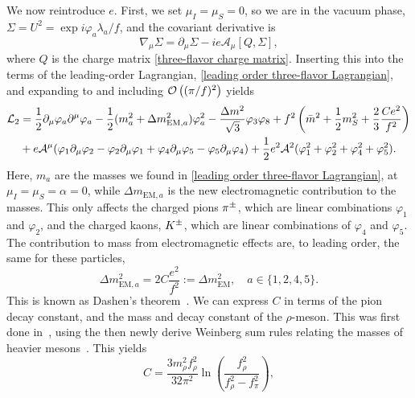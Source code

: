 We now reintroduce $e$.
First, we set $\mu_I = \mu_S = 0$, so we are in the vacuum phase, $\Sigma = U^2 = \exp{i \varphi_a \lambda_a/f}$, and the covariant derivative is
%
\begin{equation}
    \nabla_\mu \Sigma = \partial_\mu \Sigma - i e \mathcal A_\mu [Q, \Sigma],
\end{equation}
%
where $Q$ is the charge matrix \autoref{three-flavor charge matrix}.
Inserting this into the terms of the leading-order Lagrangian, \autoref{leading order three-flavor Lagrangian}, and expanding to and including $\mathcal O\left((\pi/f)^2\right)$ yields
%
\begin{align}
    \nonumber
    \mathcal{L}_2
    &= 
    \frac{1}{2} \partial_\mu \varphi_a \partial^\mu \varphi_a
    - \frac{1}{2}(m_{a}^2 + \Delta m_{\text{EM},a}^2)\varphi_a^2
    - \frac{\Delta m^2}{\sqrt 3} \varphi_3 \varphi_8
    + f^2 \left(\bar m^2 + \frac{1}{2} m_S^2 + \frac{2}{3}\frac{C e^2}{f^2}\right)\\
    &+ e \mathcal A^\mu 
    (
        \varphi_1 \partial_\mu \varphi_2
        - \varphi_2 \partial_\mu \varphi_1
        + \varphi_4 \partial_\mu \varphi_5
        - \varphi_5 \partial_\mu \varphi_4
    )
    + \frac{1}{2} e^2 \mathcal A^2 (\varphi_1^2 +\varphi_2^2 + \varphi_4^2 +\varphi_5^2).
\end{align}
%
Here, $m_{a}$ are the masses  we found in \autoref{leading order three-flavor Lagrangian}, at $\mu_I = \mu_S = \alpha = 0$, while $\Delta m_{\text{EM}, a}$ is the new electromagnetic contribution to the masses.
This only affects the charged pions ${\pi^\pm}$, which are linear combinations $\varphi_1$ and $\varphi_2$, and the charged kaons, ${K^\pm}$, which are linear combinations of $\varphi_4$ and $\varphi_5$.
The contribution to mass from electromagnetic effects are, to leading order, the same for these particles,
%
\begin{equation}
    \Delta m_{\text{EM}, a}^2 = 2C \frac{e^2}{f^2} := \Delta m^2_\text{EM}, \quad a \in \{1, 2, 4, 5\}.
\end{equation}
%
This is known as Dashen's theorem~\autocite{dashenChiralMathrmSUEnsuremath1969}.
We can express $C$ in terms of the pion decay constant, and the mass and decay constant of the $\rho$-meson.
This was first done in~\autocite{dasElectromagneticMassDifference1967}, using the then newly derive Weinberg sum rules relating the masses of heavier mesons~\autocite{weinbergPreciseRelationsSpectra1967}.
This yields
%
\begin{equation}
    \label{C from rho}
    C = \frac{3 m_\rho^2 f_\rho^2}{32 \pi^2} 
    \ln\left(  \frac{f_\rho^2}{f_\rho^2 - f_\pi^2}  \right),
\end{equation}
